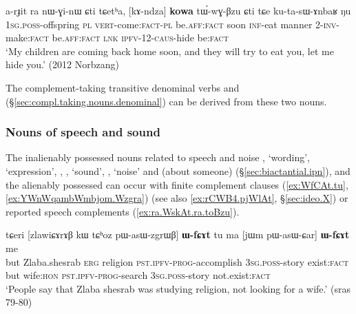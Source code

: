  \begin{exe}
\ex \label{ex:kAndza.kowa.tuwGBzu}
\gll  a-rɟit ra nɯ-ɣi-nɯ ɕti tɕetʰa, [kɤ-ndza] \textbf{kowa} tɯ́-wɣ-βzu ɕti tɕe ku-ta-sɯ-ɤnbaʁ ŋu \\
\textsc{1sg}.\textsc{poss}-offspring \textsc{pl} \textsc{vert}-come:\textsc{fact}-\textsc{pl} be.\textsc{aff}:\textsc{fact} soon \textsc{inf}-eat manner 2-\textsc{inv}-make:\textsc{fact} be.\textsc{aff}:\textsc{fact} \textsc{lnk} \textsc{ipfv}-1\fl{}2-\textsc{caus}-hide be:\textsc{fact} \\
\glt `My children are coming back home soon, and they will try to eat you, let me hide you.' (2012 Norbzang)
\end{exe}

The com\-ple\-ment-taking transitive denominal verbs  and  (§\ref{sec:compl.taking.nouns.denominal}) can be derived from these two nouns.
 
\subsubsection{Nouns of speech and sound} \label{sec:nouns.speech.complement}
The inalienably possessed nouns related to speech and noise , `wording', `expression', , , `sound', , `noise' and  (about someone) (§\ref{sec:biactantial.ipn}), and the alienably possessed  can occur with finite complement clauses (\ref{ex:WfCAt.tu}, \ref{ex:YWnWqambWmbjom.Wzgra}) (see also \ref{ex:rCWB4.pjWlAt}, §\ref{sec:ideo.X}) or reported speech complements (\ref{ex:ra.WskAt.ra.toBzu}).

\begin{exe}
   \ex  \label{ex:WfCAt.tu}
\gll  tɕeri [zlawiɕɤrɤβ kɯ tɕʰoz pɯ-asɯ-zgrɯβ] \textbf{ɯ-fɕɤt} tu ma [jɯm pɯ-asɯ-ɕar] \textbf{ɯ-fɕɤt} me \\
 but Zlaba.shesrab \textsc{erg} religion \textsc{pst}.\textsc{ipfv}-\textsc{prog}-accomplish  \textsc{3sg}.\textsc{poss}-story
exist:\textsc{fact} but wife:\textsc{hon} \textsc{pst}.\textsc{ipfv}-\textsc{prog}-search  \textsc{3sg}.\textsc{poss}-story not.exist:\textsc{fact} \\
\glt `People say that Zlaba shesrab was studying religion, not looking for a wife.'  (sras 79-80)
\end{exe}


